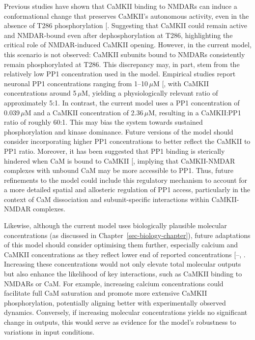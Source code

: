 \documentclass[
  11pt,
  letterpaper,
]{scrreprt}
\begin{document}
Previous studies have shown that CaMKII binding to NMDARs can induce a
conformational change that preserves CaMKII's autonomous activity, even
in the absence of T286 phosphorylation
{[}\citeproc{ref-bayer2001Interaction}{168}{]}. Suggesting that CaMKII
could remain active and NMDAR-bound even after dephosphorylation at
T286, highlighting the critical role of NMDAR-induced CaMKII opening.
However, in the current model, this scenario is not observed: CaMKII
subunits bound to NMDARs consistently remain phosphorylated at T286.
This discrepancy may, in part, stem from the relatively low PP1
concentration used in the model. Empirical studies report neuronal PP1
concentrations ranging from 1--10\,\(\mu\text{M}\)
{[}\citeproc{ref-cohen2002Protein}{447}{]}, with CaMKII concentrations
around 5\,\(\mu\text{M}\), yielding a physiologically relevant ratio of
approximately 5:1. In contrast, the current model uses a PP1
concentration of 0.039\,\(\mu\text{M}\) and a CaMKII concentration of
2.36\,\(\mu\text{M}\), resulting in a CaMKII:PP1 ratio of roughly 60:1.
This may bias the system towards sustained phosphorylation and kinase
dominance. Future versions of the model should consider incorporating
higher PP1 concentrations to better reflect the CaMKII to PP1 ratio.
Moreover, it has been suggested that PP1 binding is sterically hindered
when CaM is bound to CaMKII
{[}\citeproc{ref-pharris2019Multistate}{185}{]}, implying that
CaMKII-NMDAR complexes with unbound CaM may be more accessible to PP1.
Thus, future refinements to the model could include this regulatory
mechanism to account for a more detailed spatial and allosteric
regulation of PP1 access, particularly in the context of CaM
dissociation and subunit-specific interactions within CaMKII-NMDAR
complexes.

Likewise, although the current model uses biologically plausible
molecular concentrations (as discussed in
Chapter~\ref{sec-biology-chapter}), future adaptations of this model
should consider optimising them further, especially calcium and CaMKII
concentrations as they reflect lower end of reported concentrations
{[}--,
\citeproc{ref-otmakhov2012Measuring}{445}{]}. Increasing these
concentrations would not only elevate total molecular outputs but also
enhance the likelihood of key interactions, such as CaMKII binding to
NMDARs or CaM. For example, increasing calcium concentrations could
facilitate full CaM saturation and promote more extensive CaMKII
phosphorylation, potentially aligning better with experimentally
observed dynamics. Conversely, if increasing molecular concentrations
yields no significant change in outputs, this would serve as evidence
for the model's robustness to variations in input conditions.
\end{document}
